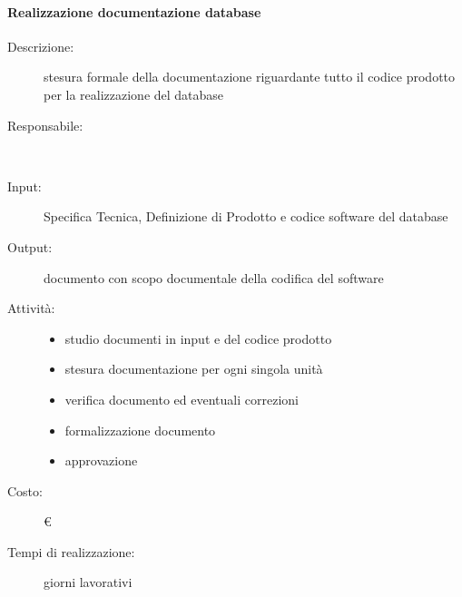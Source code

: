 \paragraph{Realizzazione documentazione database}
\begin{description}
\item[Descrizione:] stesura formale della documentazione riguardante tutto il codice prodotto
per la realizzazione del database \\

\item[Responsabile:] \\

\item[Input:] Specifica Tecnica, Definizione di Prodotto e codice software del database \\

\item[Output:] documento con scopo documentale della codifica del software \\

\item[Attività:]
\begin{itemize}
\item studio documenti in input e del codice prodotto
\item stesura documentazione per ogni singola unità
\item verifica documento ed eventuali correzioni
\item formalizzazione documento
\item approvazione
\end{itemize}
\item[Costo:] \euro \\
\item[Tempi di realizzazione:]  giorni lavorativi
\end{description}



